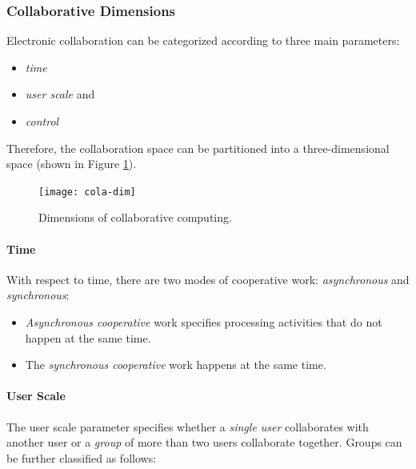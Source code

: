 \subsubsection*{Collaborative Dimensions}	
Electronic collaboration can be categorized according to three main parameters:
\begin{multicols}{3}
	\begin{itemize}
		\item \textit{time}
		\item \textit{user scale} and 
		\item \textit{control}
	\end{itemize}
\end{multicols}


Therefore, the collaboration space can be partitioned into a three-dimensional space (shown in Figure {\ref{fig:cola-dim}}).

\begin{figure}[ht!]
	\centering
	\texttt{[image: cola-dim]}
	\caption{Dimensions of collaborative computing.}\label{fig:cola-dim}
\end{figure}


\paragraph*{Time}
With respect to time, there are two modes of cooperative work: \textit{asynchronous} and \textit{synchronous}:
\begin{itemize}
	\item \textit{Asynchronous cooperative} work specifies processing activities
	that do not happen at the same time.
	\item The \textit{synchronous cooperative} work happens at the same time.
\end{itemize}

\paragraph*{User Scale}
The user scale parameter specifies whether a \textit{single user} collaborates with
another user or a \textit{group} of more than two users collaborate together. Groups can
be further classified as follows:

